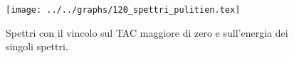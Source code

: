\begin{figure}[h] \centering\texttt{[image: ../../graphs/120\_spettri\_pulitien.tex]}\caption{Spettri con il vincolo sul TAC maggiore di zero e sull'energia dei singoli spettri. }\label{gr:120_spettri_pulitien} \end{figure}
